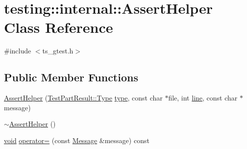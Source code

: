 \hypertarget{classtesting_1_1internal_1_1AssertHelper}{\section{testing\-:\-:internal\-:\-:Assert\-Helper Class Reference}
\label{classtesting_1_1internal_1_1AssertHelper}
}


{\ttfamily \#include $<$ts\-\_\-gtest.\-h$>$}

\subsection*{Public Member Functions}
\begin{DoxyCompactItemize}
\item 
\hyperlink{classtesting_1_1internal_1_1AssertHelper_ac2c9334518fd4087189b4505567a3c90}{Assert\-Helper} (\hyperlink{classtesting_1_1TestPartResult_a65ae656b33fdfdfffaf34858778a52d5}{Test\-Part\-Result\-::\-Type} \hyperlink{imgproc__c_8h_a84612d8738bf935200cf32a103d8efe1}{type}, const char $\ast$file, int \hyperlink{legacy_8hpp_a5a869825573cfaf8861a6ec0fe0f262f}{line}, const char $\ast$message)
\item 
\hyperlink{classtesting_1_1internal_1_1AssertHelper_a51c640785d4ed4a0155cc9aa857d8931}{$\sim$\-Assert\-Helper} ()
\item 
\hyperlink{legacy_8hpp_a8bb47f092d473522721002c86c13b94e}{void} \hyperlink{classtesting_1_1internal_1_1AssertHelper_ab721be11cb9aca8a361ca1f014ca5f80}{operator=} (const \hyperlink{classtesting_1_1Message}{Message} \&message) const 
\end{DoxyCompactItemize}


